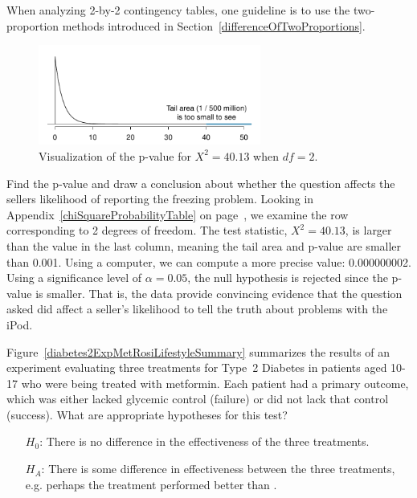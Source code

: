 When analyzing 2-by-2 contingency tables, one guideline
is to use the two-proportion methods introduced in
Section~\ref{differenceOfTwoProportions}.

\begin{figure}[h]
\centering
\includegraphics[width=0.65\textwidth]{ch_inference_for_props/figures/iPodChiSqTail/iPodChiSqTail}
\caption{Visualization of the p-value for $X^2 = 40.13$
    when $df = 2$.}
\label{iPodChiSqTail}
\end{figure}

\begin{example}{Find the p-value and draw a conclusion
    about whether the question affects the sellers likelihood
    of reporting the freezing problem.}
  Looking in Appendix~\ref{chiSquareProbabilityTable}
  on page~\pageref{chiSquareProbabilityTable},
  we examine the row corresponding to 2 degrees of freedom.
  The test statistic, $X^2 = 40.13$,
  is larger than the value in the last column,
  meaning the tail area and p-value are smaller than 0.001.
  Using a computer, we can compute a more precise value:
  0.000000002.
  Using a significance level of $\alpha=0.05$,
  the null hypothesis is rejected since the p-value is smaller.
  That is, the data provide convincing evidence that the
  question asked did affect a seller's likelihood to tell
  the truth about problems with the iPod.
\end{example}



\begin{example}{Figure~\ref{diabetes2ExpMetRosiLifestyleSummary}
    summarizes the results of an experiment evaluating
    three treatments for Type~2 Diabetes in patients
    aged 10-17 who were being treated with metformin.
    Each patient had a primary outcome, which was either lacked
    glycemic control (failure)
    or did not lack that control (success).
    What are appropriate hypotheses for this test?}
  \label{diabetes2ExpMetRosiLifestyleIntroExample}
  \begin{itemize}
  \item[$H_0$:] There is no difference in the effectiveness
      of the three treatments.
  \item[$H_A$:] There is some difference in effectiveness
      between the three treatments, e.g. perhaps the
       treatment performed better than
      .
  \end{itemize}
\end{example}

